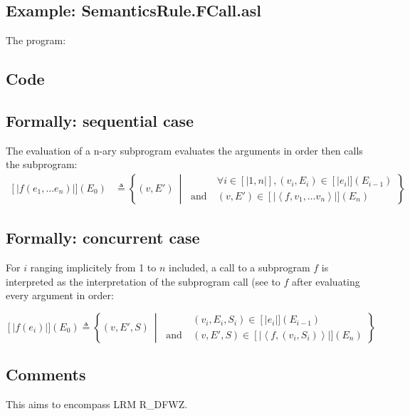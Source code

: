 \documentclass{book}
\newcommand\llbracket{[|}
\newcommand\rrbracket{|]}
\newcommand\interp[1]{\left\llbracket #1 \right\rrbracket}
\newcommand\st[0]{\ \middle|\ }
\begin{document}
  \subsection{Example: SemanticsRule.FCall.asl}
  The program:

  \subsection{Code}

  \subsection{Formally: sequential case}
  The evaluation of a n-ary subprogram evaluates the arguments in order then
  calls the subprogram:
  \begin{align}
  \interp{f (e_1, \dotsc e_n)} (E_0) & \triangleq
    \left\{ (v, E') \st{}
    \begin{aligned}
      & \forall i \in \llbracket 1, n \rrbracket, (v_i, E_i) \in \interp{e_i} (E_{i - 1})
      \\ \text{and}\ &
      (v, E') \in \interp{\left\langle f, v_1, \dotsc v_n \right\rangle} \left(E_n\right)
    \end{aligned}
    \right\}
  \label{eq:sem-seq-fcall}
  \end{align} 

  \subsection{Formally: concurrent case}
  For $i$ ranging implicitely from 1 to $n$ included, a call to a subprogram $f$
  is interpreted as the interpretation of the subprogram call (see to $f$ after
  evaluating every argument in order:

  \begin{equation}
    \interp{f (e_i)} (E_0) \triangleq
      \left\{ (v, E', S) \st{}
      \begin{aligned}
        & %
          (v_i, E_i, S_i) \in \interp{e_i} (E_{i - 1})
        \\ \text{and}\ &
        (v, E', S) \in \interp{\left\langle f, (v_i,S_i) \right\rangle} \left(E_n\right)
      \end{aligned}
      \right\}
    \label{eq:sem-conc-fcall}
  \end{equation}

  \subsection{Comments}
  This aims to encompass LRM R\_DFWZ.
\end{document}
